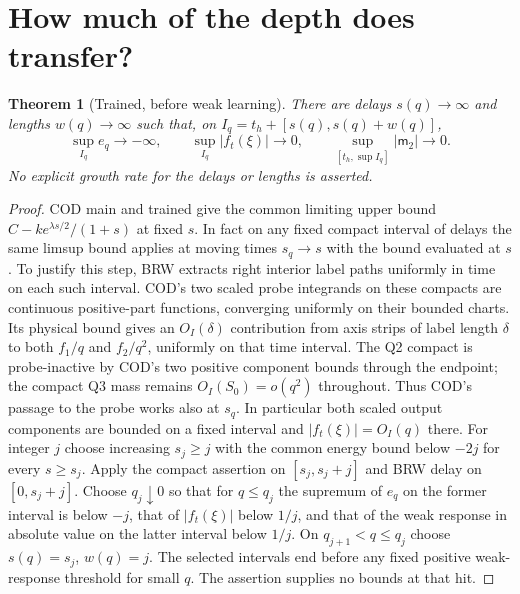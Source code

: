 \documentclass[11pt]{article}
\newtheorem{theorem}{Theorem}
\begin{document}
\section{How much of the depth does transfer?}
\begin{theorem}[Trained, before weak learning]\label{an04drrv1:interval}
There are delays $s(q)\to\infty$ and lengths $w(q)\to\infty$ such
that, on $I_q=t_h+[s(q),s(q)+w(q)]$,
\[
 \sup_{I_q}e_q\to-\infty,\qquad
 \sup_{I_q}|f_t(\xi)|\to0,\qquad
 \sup_{[t_h,\sup I_q]}|\mathsf m_2|\to0 .
\]
No explicit growth rate for the delays or lengths is asserted.
\end{theorem}
\begin{proof}
COD main and trained give the common limiting upper bound
$C-k e^{\lambda s/2}/(1+s)$ at fixed $s$. In fact on any fixed compact
interval of delays the same limsup bound applies at moving times
$s_q\to s$ with the bound evaluated at $s$. To justify this step,
BRW extracts right interior label paths uniformly in time on each
such interval. COD's two scaled probe integrands on these compacts
are continuous positive-part functions, converging uniformly on
their bounded charts. Its physical bound gives an $O_I(\delta)$
contribution from axis strips of label length $\delta$ to both
$f_1/q$ and $f_2/q^2$, uniformly on that time interval. The Q2
compact is probe-inactive by COD's two positive component bounds
through the endpoint; the compact Q3 mass remains $O_I(S_0)=o(q^2)$
throughout. Thus COD's passage to the probe works also at $s_q$.
In particular both scaled output components are bounded on a fixed
interval and $|f_t(\xi)|=O_I(q)$ there.
For integer $j$ choose increasing $s_j\ge j$ with the common energy
bound below $-2j$ for every $s\ge s_j$. Apply the compact assertion
on $[s_j,s_j+j]$ and BRW delay on $[0,s_j+j]$. Choose $q_j\downarrow0$
so that for $q\le q_j$ the supremum of $e_q$ on the former interval
is below $-j$, that of $|f_t(\xi)|$ below $1/j$, and that of the
weak response in absolute value on the latter interval below $1/j$.
On $q_{j+1}<q\le q_j$ choose $s(q)=s_j$, $w(q)=j$.
The selected intervals end before any fixed positive weak-response
threshold for small $q$. The assertion supplies no bounds at that hit.
\end{proof}
\end{document}
